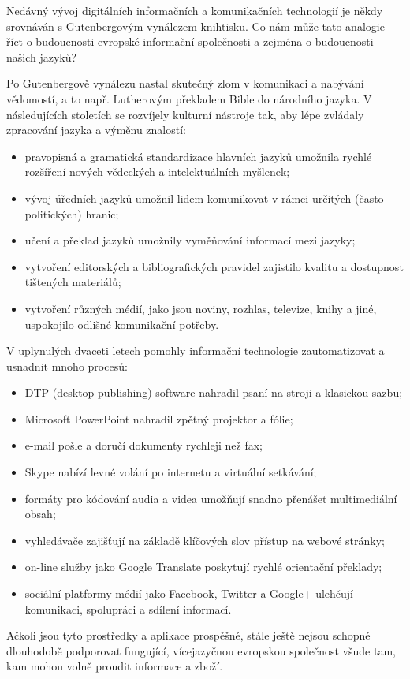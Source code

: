 \begin{multicols}{2}
Nedávný vývoj digitálních informačních a komunikačních technologií je někdy srovnáván s Gutenbergovým vynálezem knihtisku. Co nám může tato analogie říct o budoucnosti evropské informační společnosti a zejména o budoucnosti našich jazyků?


Po Gutenbergově vynálezu nastal skutečný zlom v komunikaci a nabývání vědomostí, a to např. Lutherovým překladem Bible do národního jazyka.
V následujících stoletích se rozvíjely kulturní nástroje tak, aby lépe zvládaly zpracování jazyka a výměnu znalostí:
    \begin{itemize}
      \item pravopisná a gramatická standardizace hlavních jazyků umožnila rychlé rozšíření nových vědeckých a intelektuálních myšlenek;
      \item vývoj úředních jazyků umožnil lidem komunikovat v rámci určitých (často politických) hranic;
      \item učení a překlad jazyků umožnily vyměňování informací mezi jazyky;
      \item vytvoření editorských a bibliografických pravidel zajistilo kvalitu a dostupnost tištených materiálů;
      \item vytvoření různých médií, jako jsou noviny, rozhlas, televize, knihy a jiné, uspokojilo odlišné komunikační potřeby.
    \end{itemize}
    
V uplynulých dvaceti letech pomohly informační technologie zautomatizovat a usnadnit mnoho procesů:
    \begin{itemize}
      \item DTP (desktop publishing) software nahradil psaní na stroji a klasickou sazbu;
      \item Microsoft PowerPoint nahradil zpětný projektor a fólie;
      \item e-mail pošle a doručí dokumenty rychleji než fax;
      \item Skype nabízí levné volání po internetu a virtuální setkávání;
      \item formáty pro kódování audia a videa umožňují snadno přenášet multimediální obsah;
      \item vyhledávače zajišťují na základě klíčových slov přístup na webové stránky;
      \item on-line služby jako Google Translate poskytují rychlé orientační překlady;
      \item sociální platformy médií jako Facebook, Twitter a Google+ ulehčují komunikaci, spolupráci a sdílení informací.
    \end{itemize}
Ačkoli jsou tyto prostředky a aplikace prospěšné, stále ještě nejsou schopné dlouhodobě podporovat fungující, vícejazyčnou evropskou společnost všude tam, kam mohou volně proudit informace a zboží.
\pagebreak

\end{multicols}
